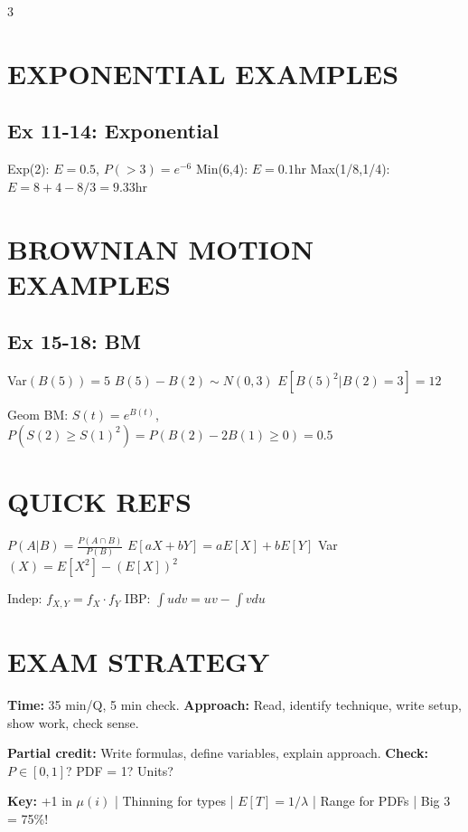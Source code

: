 \documentclass[7pt,landscape]{extarticle}
\begin{document}
\begin{multicols}{3}
\section*{EXPONENTIAL EXAMPLES}

\subsection*{Ex 11-14: Exponential}
Exp(2): $E = 0.5$, $P(>3) = e^{-6}$ \quad Min(6,4): $E = 0.1$hr \quad Max(1/8,1/4): $E = 8+4-8/3 = 9.33$hr

\section*{BROWNIAN MOTION EXAMPLES}

\subsection*{Ex 15-18: BM}
Var$(B(5)) = 5$ \quad $B(5)-B(2) \sim N(0,3)$ \quad $E[B(5)^2|B(2)=3] = 12$

Geom BM: $S(t)=e^{B(t)}$, $P(S(2) \geq S(1)^2) = P(B(2)-2B(1) \geq 0) = 0.5$

\section*{QUICK REFS}

$P(A|B) = \frac{P(A \cap B)}{P(B)}$ \quad $E[aX+bY] = aE[X]+bE[Y]$ \quad Var$(X) = E[X^2]-(E[X])^2$

Indep: $f_{X,Y} = f_X \cdot f_Y$ \quad IBP: $\int u dv = uv - \int v du$

\section*{EXAM STRATEGY}

\textbf{Time:} 35 min/Q, 5 min check. \textbf{Approach:} Read, identify technique, write setup, show work, check sense.

\textbf{Partial credit:} Write formulas, define variables, explain approach. \textbf{Check:} $P \in [0,1]$? PDF = 1? Units?

\vspace{2pt}

\textbf{Key:} +1 in $\mu(i)$ | Thinning for types | $E[T] = 1/\lambda$ | Range for PDFs | Big 3 = 75\%!

\end{multicols}
\end{document}
